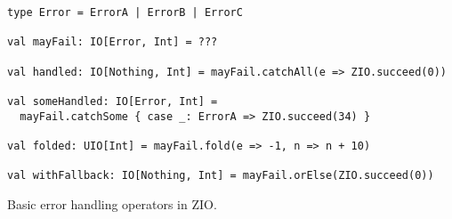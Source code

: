 \begin{algorithm}

\begin{verbatim}
type Error = ErrorA | ErrorB | ErrorC

val mayFail: IO[Error, Int] = ???

val handled: IO[Nothing, Int] = mayFail.catchAll(e => ZIO.succeed(0))

val someHandled: IO[Error, Int] =
  mayFail.catchSome { case _: ErrorA => ZIO.succeed(34) }

val folded: UIO[Int] = mayFail.fold(e => -1, n => n + 10)

val withFallback: IO[Nothing, Int] = mayFail.orElse(ZIO.succeed(0))
\end{verbatim}

\caption{Basic error handling operators in ZIO. \label{zio:error-handling-operators}}
\end{algorithm}